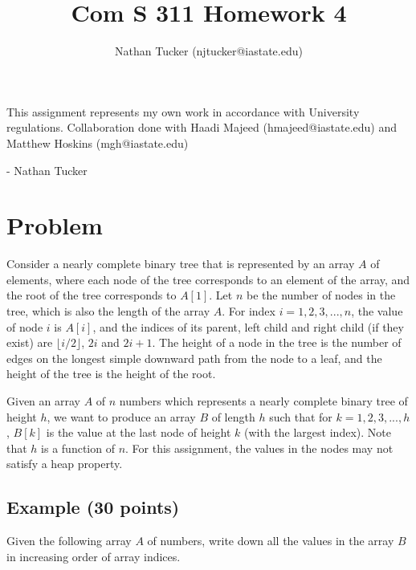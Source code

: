 \documentclass[11pt]{amsart}
\begin{document}
\pagestyle{plain}

\title{Com S 311 Homework 4}
\author{Nathan Tucker (njtucker@iastate.edu)}
\maketitle

\doublespacing

\vspace{10mm}

\vfill
\begin{flushright}
This assignment represents my own work in accordance with University regulations. Collaboration done with Haadi Majeed (hmajeed@iastate.edu) and Matthew Hoskins (mgh@iastate.edu)

- Nathan Tucker
\end{flushright}
\newpage
\vspace{-.8cm}

\section*{Problem}

Consider a nearly complete binary tree that is represented by an array $A$ of elements,
where each node of the tree corresponds to an element of the array,
and the root of the tree corresponds to $A[1]$. Let $n$ be the number of nodes
in the tree, which is also the length of the array $A$.
For index $i = 1, 2, 3, ..., n$, the value of node $i$ is $A[i]$,
and the indices of its parent, left child and right child (if they exist)
are $\lfloor{i/2}\rfloor$, $2i$ and $2i+1$.
The height of a node in the tree is the number of edges on the longest
simple downward path from the node to a leaf, and the height of
the tree is the height of the root.

Given an array $A$ of $n$ numbers which represents a nearly complete binary tree
of height $h$, we want to produce an array $B$ of length $h$ such that
for $k = 1, 2, 3, ..., h$, $B[k]$ is the value at the last node of height $k$
(with the largest index). Note that $h$ is a function of $n$.
For this assignment, the values in the nodes may not satisfy a heap property.

\subsection*{Example (30 points)}

Given the following array $A$ of numbers, write down all the values
in the array $B$ in increasing order of array indices.
\end{document}

